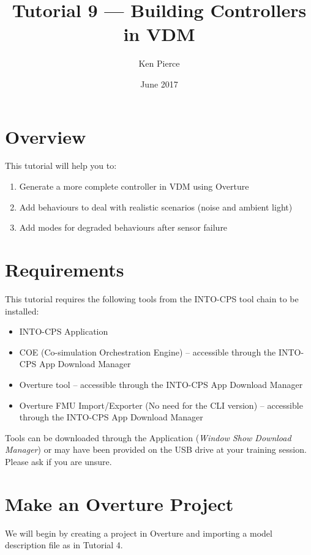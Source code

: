 \documentclass[11pt,a4paper]{../tutorial}
\title{Tutorial 9 --- Building Controllers in VDM}
\date{June 2017}
\author{Ken Pierce}
\begin{document}
\section*{Overview}

This tutorial will help you to:

\begin{enumerate}[noitemsep]
\item Generate a more complete controller in VDM using Overture
\item Add behaviours to deal with realistic scenarios (noise and ambient light)
\item Add modes for degraded behaviours after sensor failure
\end{enumerate}

\section*{Requirements}

This tutorial requires the following tools from the INTO-CPS tool chain to be installed:

\begin{itemize}[noitemsep]
	\item INTO-CPS Application
	\item COE (Co-simulation Orchestration Engine) -- accessible through the INTO-CPS App Download Manager
	\item Overture tool -- accessible through the INTO-CPS App Download Manager
	\item Overture FMU Import/Exporter (No need for the CLI version)  -- accessible through the INTO-CPS App Download Manager
\end{itemize}

Tools can be downloaded through the Application (\emph{Window \menusep Show Download Manager}) or may have been provided on the USB drive at your training session. Please ask if you are unsure.

\section{Make an Overture Project}

We will begin by creating a project in Overture and importing a model description file as in Tutorial 4.
\end{document}
